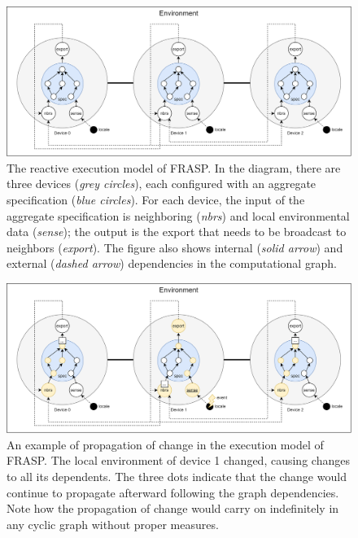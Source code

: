 \begin{figure}[!ht]
  \centering
  \includegraphics[width=1\textwidth]{resources/figures/frasp-simulation.png}
  \caption{
    The reactive execution model of FRASP. In the diagram, there are three
    devices (\textit{grey circles}), each configured with an aggregate
    specification (\textit{blue circles}). For each device, the input of the
    aggregate specification is neighboring (\textit{nbrs}) and local
    environmental data (\textit{sense}); the output is the export that needs to
    be broadcast to neighbors (\textit{export}). The figure also shows internal
    (\textit{solid arrow}) and external (\textit{dashed arrow}) dependencies in
    the computational graph.
  }
  \label{figure:frasp-simulation}
\end{figure}

\begin{figure}[!ht]
  \centering
  \includegraphics[width=1\textwidth]{resources/figures/frasp-simulation-example.png}
  \caption{
    An example of propagation of change in the execution model of FRASP. The
    local environment of device 1 changed, causing changes to all its
    dependents. The three dots indicate that the change would continue to
    propagate afterward following the graph dependencies. Note how the
    propagation of change would carry on indefinitely in any cyclic graph
    without proper measures.
  }
  \label{figure:frasp-simulation-example}
\end{figure}

